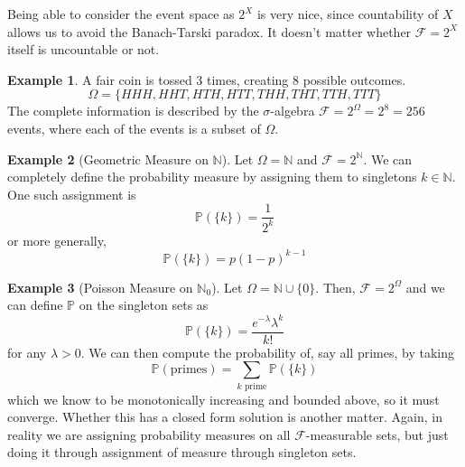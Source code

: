 \documentclass{article}
\theoremstyle{definition}
\newtheorem{example}{Example}[section]
\theoremstyle{remark}
\theoremstyle{definition}
\begin{document}
Being able to consider the event space as $2^X$ is very nice, since countability of $X$ allows us to avoid the Banach-Tarski paradox. It doesn't matter whether $\mathcal{F} = 2^X$ itself is uncountable or not. 

\begin{example}
A fair coin is tossed 3 times, creating 8 possible outcomes. 
\[\Omega = \{HHH, HHT, HTH, HTT, THH, THT, TTH, TTT\}\]
The complete information is described by the $\sigma$-algebra $\mathcal{F} = 2^{\Omega} = 2^8 = 256$ events, where each of the events is a subset of $\Omega$.  
\end{example}

\begin{example}[Geometric Measure on $\mathbb{N}$]
Let $\Omega = \mathbb{N}$ and $\mathcal{F} = 2^\mathbb{N}$. We can completely define the probability measure by assigning them to singletons $k \in \mathbb{N}$. One such assignment is 
\[\mathbb{P}(\{k\}) = \frac{1}{2^k}\]
or more generally, 
\[\mathbb{P}(\{k\}) = p (1 - p)^{k-1}\]
\end{example}

\begin{example}[Poisson Measure on $\mathbb{N}_0$]
Let $\Omega = \mathbb{N} \cup \{0\}$. Then, $\mathcal{F} = 2^\Omega$ and we can define $\mathbb{P}$ on the singleton sets as 
\[\mathbb{P}(\{k\}) = \frac{e^{-\lambda} \lambda^k}{k!}\]
for any $\lambda > 0$. We can then compute the probability of, say all primes, by taking 
\[\mathbb{P}(\text{primes}) = \sum_{k \text{ prime}} \mathbb{P}(\{k\})\]
which we know to be monotonically increasing and bounded above, so it must converge. Whether this has a closed form solution is another matter. Again, in reality we are assigning probability measures on all $\mathcal{F}$-measurable sets, but just doing it through assignment of measure through singleton sets. 
\end{example}
\end{document}
